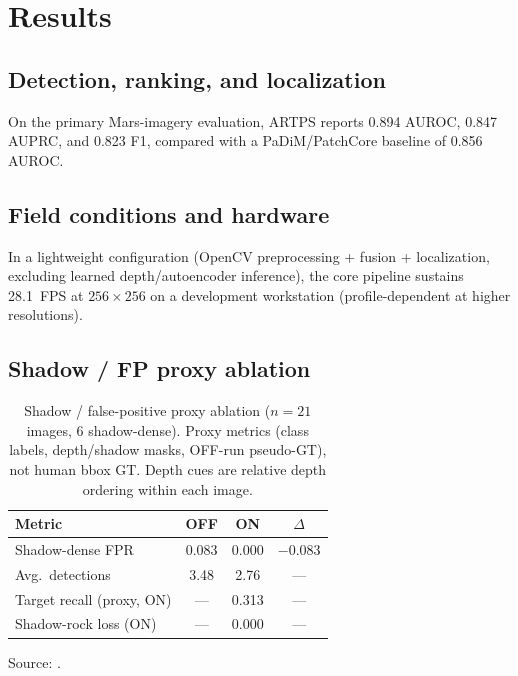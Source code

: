 \documentclass[10pt,twocolumn,letterpaper]{article}
\begin{document}
\section{Results}
\subsection{Detection, ranking, and localization}
On the primary Mars-imagery evaluation, ARTPS reports 0.894 AUROC, 0.847 AUPRC, and
0.823 F1, compared with a PaDiM/PatchCore baseline of 0.856 AUROC.

\subsection{Field conditions and hardware}
In a lightweight configuration (OpenCV preprocessing + fusion + localization, excluding
learned depth/autoencoder inference), the core pipeline sustains 28.1~FPS at $256{\times}256$
on a development workstation (profile-dependent at higher resolutions).

\subsection{Shadow / FP proxy ablation}
\begin{table}[t]
\centering
\caption{Shadow / false-positive proxy ablation ($n{=}21$ images, 6 shadow-dense).
Proxy metrics (class labels, depth/shadow masks, OFF-run pseudo-GT), not human bbox GT.
Depth cues are relative depth ordering within each image.}
\label{tab:shadow-proxy}
\small
\begin{tabular}{@{}lccc@{}}
\toprule
Metric & OFF & ON & $\Delta$ \\
\midrule
Shadow-dense FPR & 0.083 & 0.000 & $-0.083$ \\
Avg.\ detections & 3.48 & 2.76 & --- \\
Target recall (proxy, ON) & --- & 0.313 & --- \\
Shadow-rock loss (ON) & --- & 0.000 & --- \\
\bottomrule
\end{tabular}
\end{table}
Source: .
\end{document}
